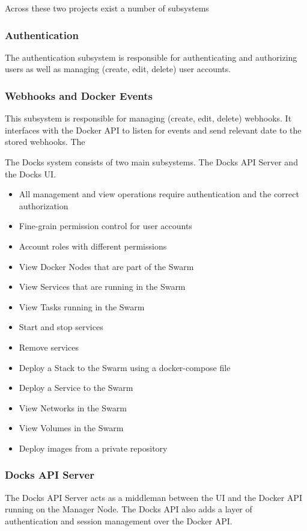 \documentclass[]{article}
\begin{document}
Across these two projects exist a number of subsystems

\subsubsection{Authentication}
The authentication subsystem is responsible for authenticating
and authorizing users as well as managing (create, edit, delete) user accounts.

\subsubsection{Webhooks and Docker Events}
This subsystem is responsible for managing (create, edit, delete) webhooks.
It interfaces with the Docker API to listen for events and send relevant
date to the stored webhooks. The

The Docks system consists of two main subsystems. The Docks API Server and the Docks UI.

\begin{itemize}
	\item All management and view operations require authentication and the correct authorization
	\item Fine-grain permission control for user accounts
	\item Account roles with different permissions
	\item View Docker Nodes that are part of the Swarm
	\item View Services that are running in the Swarm
	\item View Tasks running in the Swarm
	\item Start and stop services
	\item Remove services
	\item Deploy a Stack to the Swarm using a docker-compose file
	\item Deploy a Service to the Swarm
	\item View Networks in the Swarm
	\item View Volumes in the Swarm
	\item Deploy images from a private repository
\end{itemize}

\subsubsection{Docks API Server}
The Docks API Server acts as a middleman between the UI and the Docker API
running on the Manager Node. The Docks API also adds a layer of authentication
and session management over the Docker API.
\end{document}
